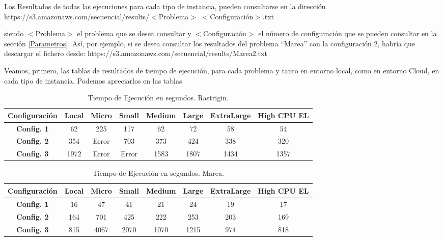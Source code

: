 \documentclass[runningheads]{llncs}
\begin{document}
Los Resultados de todas las ejecuciones para cada tipo de instancia, pueden consultarse en la dirección 
https://s3.amazonaws.com/secuencial/results/$<$Problema$>$ $<$Configuración$>$.txt

siendo $<$Problema$>$ el problema que se desea consultar y $<$Configuración$>$ el número de configuración que se pueden 
consultar en la sección \ref{Parametros}. Así, por ejemplo, si se desea consultar los resultados del problema ``Marea'' con 
la configuración 2, habría que descargar el fichero desde: 
https://s3.amazonaws.com/secuencial/results/Marea2.txt

Veamos, primero, las tablas de resultados de tiempo de ejecución, para cada problema y tanto en entorno local, como en 
entorno Cloud, en cada tipo de instancia. Podemos apreciarlos en las tablas 

\begin{table}[htb]
\begin{tabular}{|| c | c | c | c | c |c | c | c ||}
    \hline
    \textbf{Configuración} & \textbf{Local} & \textbf{Micro} & \textbf{Small} & \textbf{Medium} &
    \textbf{Large} & \textbf{ExtraLarge} & \textbf{High CPU EL}  \\

    \hline
    \textbf{Config. 1} & 62 & 225 & 117 & 62 & 72 & 58 & 54 \\
    \hline
    \textbf{Config. 2} & 354 & Error & 703 & 373 & 424 & 338 & 320 \\
    \hline
    \textbf{Config. 3} & 1972 & Error & Error & 1583 & 1807 & 1434 & 1357 \\
    \hline
  \end{tabular}
  \caption{Tiempo de Ejecución en segundos. Rastrigin.} 
  \label{TablaParametrosRastrigin}
\end{table}


\begin{table}[htb]
\begin{tabular}{|| c | c | c | c | c |c | c | c ||}
    \hline
    \textbf{Configuración} & \textbf{Local} & \textbf{Micro} & \textbf{Small} & \textbf{Medium} &
    \textbf{Large} & \textbf{ExtraLarge} & \textbf{High CPU EL}  \\

    \hline
    \textbf{Config. 1} & 16 & 47 & 41 & 21 & 24 & 19 & 17 \\
    \hline
    \textbf{Config. 2} & 164 & 701 & 425 & 222 & 253 & 203 & 169 \\
    \hline
    \textbf{Config. 3} & 815 & 4067 & 2070 & 1070 & 1215 & 974 & 818 \\
    \hline
  \end{tabular}
  \caption{Tiempo de Ejecución en segundos. Marea.} 
  \label{TablaParametrosMarea}
\end{table}
\end{document}
